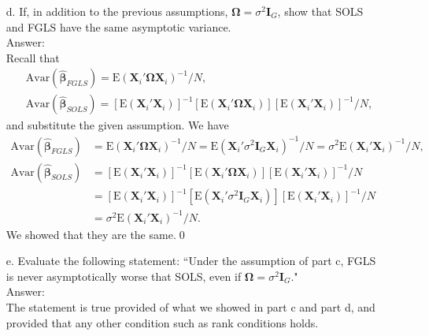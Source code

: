 \documentclass[10pt]{article}
\newcommand{\E}{\text{E}}
\newcommand{\Av}{\text{Avar}}
\begin{document}
\begin{enumerate}
\item[d.] If, in addition to the previous assumptions, $\pmb{\Omega}=\sigma^2 \textbf{I}_G$, show that SOLS and FGLS have the same asymptotic variance.
\\ Answer:\\
Recall that
\begin{align*}
    &\Av(\hat{\pmb{\beta}}_{FGLS})=\E(\textbf{X}_i'\pmb{\Omega}\textbf{X}_i)^{-1}/N, \\
    &\Av(\hat{\pmb{\beta}}_{SOLS})=[\E(\textbf{X}_i'\textbf{X}_i)]^{-1}[\E(\textbf{X}_i'\pmb{\Omega}\textbf{X}_i)][\E(\textbf{X}_i'\textbf{X}_i)]^{-1}/N,
\end{align*}and substitute the given assumption. We have
\begin{align*}
    \Av(\hat{\pmb{\beta}}_{FGLS})&=\E(\textbf{X}_i'\pmb{\Omega}\textbf{X}_i)^{-1}/N=\E(\textbf{X}_i'\sigma^2 \textbf{I}_G\textbf{X}_i)^{-1}/N=\sigma^2\E(\textbf{X}_i'\textbf{X}_i)^{-1}/N, \\
    \Av(\hat{\pmb{\beta}}_{SOLS})&=[\E(\textbf{X}_i'\textbf{X}_i)]^{-1}[\E(\textbf{X}_i'\pmb{\Omega}\textbf{X}_i)][\E(\textbf{X}_i'\textbf{X}_i)]^{-1}/N\\
    &=[\E(\textbf{X}_i'\textbf{X}_i)]^{-1}[\E(\textbf{X}_i'\sigma^2 \textbf{I}_G\textbf{X}_i)][\E(\textbf{X}_i'\textbf{X}_i)]^{-1}/N\\
    &=\sigma^2\E(\textbf{X}_i'\textbf{X}_i)^{-1}/N.
\end{align*}
We showed that they are the same.\qed

\item[e.] Evaluate the following statement: ``Under the assumption of part c, FGLS is never asymptotically worse that SOLS, even if $\pmb{\Omega}=\sigma^2 \textbf{I}_G$."
\\ Answer:\\
The statement is true provided of what we showed in part c and part d, and provided that any other condition such as rank conditions holds.

\end{enumerate}
\end{document}
